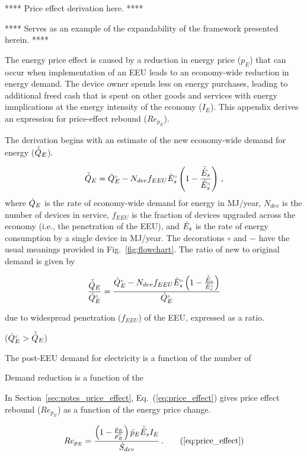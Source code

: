

**** Price effect derivation here. ****

**** Serves as an example of the expandability 
of the framework presented herein. ****


The energy price effect is caused by a reduction 
in energy price ($p_E$)
that can occur when implementation of an EEU
leads to an economy-wide reduction in energy demand.
The device owner spends less on energy purchases, 
leading to additional freed cash
that is spent on other goods and services
with energy imnplications 
at the energy intensity of the economy ($I_E$).
This appendix derives an expression for 
price-effect rebound ($Re_{p_E}$).

The derivation begins with an estimate of the new economy-wide 
demand for energy ($\bar{\dot{Q}}_E$).

\begin{equation}
  \bar{\dot{Q}}_E = {}{\dot{Q}}^{\scriptscriptstyle \circ}_E - N_{dev} f_{EEU} {}{\dot{E}}^{\scriptscriptstyle \circ}_s \left( 1 - \frac{\bar{\dot{E}}_s}{{}{\dot{E}}^{\scriptscriptstyle \circ}_s} \right) \, ,
\end{equation}
%
where
$\dot{Q}_E$ is the rate of economy-wide demand for energy in MJ/year,
$N_{dev}$ is the number of devices in service, 
$f_{EEU}$ is the fraction of devices upgraded across the economy
(i.e., the penetration of the EEU), and
$\dot{E}_s$ is the rate of energy consumption by a single device in MJ/year.
The decorations $\circ$ and $-$ have the usual meanings
provided in Fig.~\ref{fig:flowchart}.
The ratio of new to original demand is given by

\begin{equation}
  \frac{\bar{\dot{Q}}_E}{{}{\dot{Q}}^{\scriptscriptstyle \circ}_E} =
        \frac{{}{\dot{Q}}^{\scriptscriptstyle \circ}_E - N_{dev} f_{EEU} {}{\dot{E}}^{\scriptscriptstyle \circ}_s \left( 1 - \frac{\bar{\dot{E}}_s}{{}{\dot{E}}^{\scriptscriptstyle \circ}_s}  \right)}
        {{}{\dot{Q}}^{\scriptscriptstyle \circ}_E}
\end{equation}
%



due to widespread penetration ($f_{EEU}$) of the EEU,
expressed as a ratio.


 (${}{\dot{Q}}^{\scriptscriptstyle \circ}_E > \bar{\dot{Q}}_E$)



The post-EEU demand for electricity is a function of the number of 

Demand reduction is a function of the 

In Section~\ref{sec:notes_price_effect}, 
Eq.~(\ref{eq:price_effect}) gives
price effect rebound ($Re_{p_E}$)
as a function of the energy price change.

\begin{equation}
  Re_{p_E} = \frac{\left(1 - \frac{\ainc{p}_E}{\bempl{p}_E}\right) \ainc{p}_E \rainc{E}_s I_E}{\Sdot} \, .  \tag{\ref{eq:price_effect}}
\end{equation}
%
